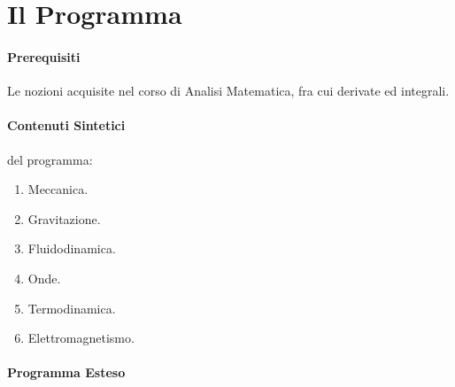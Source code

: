 \documentclass[12pt, a4paper, openany]{book}
\begin{document}
\section{Il Programma}
\paragraph*{Prerequisiti} Le nozioni acquisite nel corso di Analisi Matematica, fra cui derivate ed integrali.

\paragraph*{Contenuti Sintetici} del programma:
\begin{enumerate}
    \item Meccanica.
    \item Gravitazione.
    \item Fluidodinamica.
    \item Onde.
    \item Termodinamica.
    \item Elettromagnetismo.
\end{enumerate}

\paragraph*{Programma Esteso}
\end{document}
